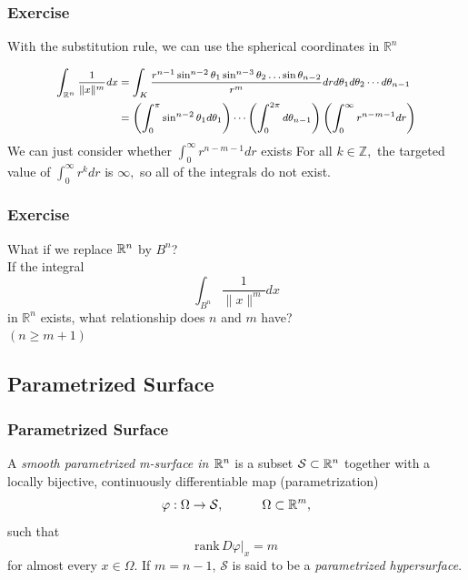 \documentclass[12pt, t]{beamer}
\renewcommand{\emph}[1]{{\color{Turquoise3}\textsl{#1}}}
\newcommand{\nullspace}{~\\[15pt]}
\begin{document}
\begin{frame}
    \frametitle{Exercise}
    With the substitution rule, we can use the spherical coordinates in $\mathbb{R}^{n}$
    
    \[
        \footnotesize
        \begin{aligned}
            \int_{\mathbb{R}^{n}} \frac{1}{\|x\|^{m}} d x & =\int_{K} \frac{r^{n-1} \sin ^{n-2} \theta_{1} \sin ^{n-3} \theta_{2} \ldots \sin \theta_{n-2}}{r^{m}} d r d \theta_{1} d \theta_{2} \cdots d \theta_{n-1}                      \\
                                                          & =\left(\int_{0}^{\pi} \sin ^{n-2} \theta_{1} d \theta_{1}\right) \cdots\left(\int_{0}^{2\pi}   d \theta_{n-1}\right)\left(\int_{0}^{\infty} r^{n-m-1} d r\right)
        \end{aligned}
    \]
    We can just consider whether $\int_{0}^{\infty} r^{n-m-1} d r$ exists For all $k \in \mathbb{Z},$ the targeted value of $\int_{0}^{\infty} r^{k} d r$ is $\infty,$ so all of the integrals do not exist.
\end{frame}

\begin{frame}
    \frametitle{Exercise}
    What if we replace $\mathbb{R}^n$ by $B^n$?
    \nullspace
    If the integral $$\int_{B^n} \frac{1}{\|x\|^{m}} d x$$ in $\mathbb{R}^{n}$ exists, what relationship does $n$ and $m$ have?
    \nullspace
    \pause $(n \geq m+1)$
\end{frame}

\subsection{Parametrized Surface}
\begin{frame}
    \frametitle{Parametrized Surface}
    A \emph{smooth parametrized m-surface in $\mathbb{R}^n$} is a subset $\mathcal{S}\subset\mathbb{R}^n$ together with a locally bijective, continuously dif{}ferentiable map (parametrization)
    \[\varphi:\Omega\to\mathcal{S},\qquad\quad
        \Omega\subset\mathbb{R}^m,\]
    such that
    \[\text{rank}\,D\varphi|_x=m\]
    for almost every $x\in\Omega$. If $m=n-1$, $\mathcal{S}$ is said to be a \emph{parametrized hypersurface}.
\end{frame}
\end{document}
